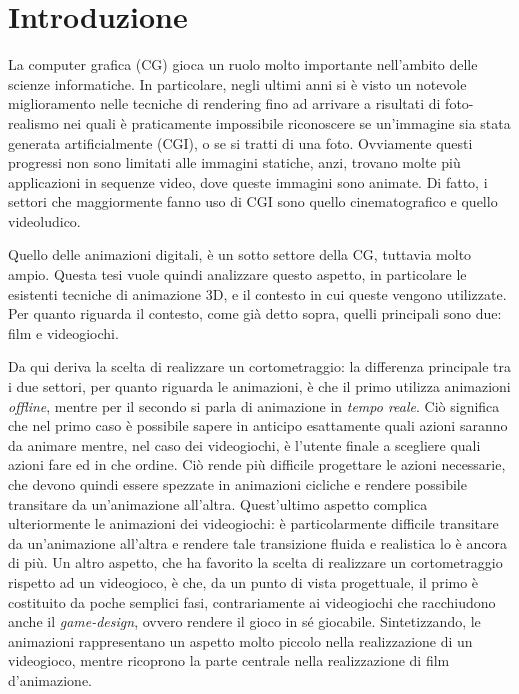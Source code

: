
\chapter{Introduzione} %

\label{Chapter1} %


La computer grafica (CG) gioca un ruolo molto importante nell'ambito delle scienze informatiche. In particolare, negli ultimi anni si è visto un notevole miglioramento nelle tecniche di rendering fino ad arrivare a risultati di foto-realismo nei quali è praticamente impossibile riconoscere se un'immagine sia stata generata artificialmente (CGI), o se si tratti di una foto.
Ovviamente questi progressi non sono limitati alle immagini statiche, anzi, trovano molte più applicazioni in sequenze video, dove queste immagini sono animate. 
Di fatto, i settori che maggiormente fanno uso di CGI sono quello cinematografico e quello videoludico.
\newline

Quello delle animazioni digitali, è un sotto settore della CG, tuttavia molto ampio. Questa tesi vuole quindi analizzare questo aspetto, in particolare le esistenti tecniche di animazione 3D, e il contesto in cui queste vengono utilizzate. Per quanto riguarda il contesto, come già detto sopra, quelli principali sono due: film e videogiochi.

Da qui deriva la scelta di realizzare un cortometraggio: la differenza principale tra i due settori, per quanto riguarda le animazioni, è che il primo utilizza animazioni \emph{offline}, mentre per il secondo si parla di animazione in \emph{tempo reale}.
Ciò significa che nel primo caso è possibile sapere in anticipo esattamente quali azioni saranno da animare mentre, nel caso dei videogiochi, è l'utente finale a scegliere quali azioni fare ed in che ordine. Ciò rende più difficile progettare le azioni necessarie, che devono quindi essere spezzate in animazioni cicliche e rendere possibile transitare da un'animazione all'altra. Quest'ultimo aspetto complica ulteriormente le animazioni dei videogiochi: è particolarmente difficile transitare da un'animazione all'altra e rendere tale transizione fluida e realistica lo è ancora di più.
Un altro aspetto, che ha favorito la scelta di realizzare un cortometraggio rispetto ad un videogioco, è che, da un punto di vista progettuale, il primo è costituito da poche semplici fasi, contrariamente ai videogiochi che racchiudono anche il \emph{game-design}, ovvero rendere il gioco in sé giocabile. Sintetizzando, le animazioni rappresentano un aspetto molto piccolo nella realizzazione di un videogioco, mentre ricoprono la parte centrale nella realizzazione di film d'animazione.


